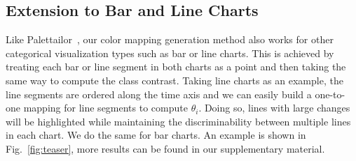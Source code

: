 


\subsection{Extension to Bar and Line Charts}
\label{subsec:ext}
Like Palettailor~\cite{Lu21}, our color mapping generation method also works for other categorical visualization types such as bar or line charts. This is achieved by treating each bar or line segment in both charts as a point and then taking the same way to compute the class contrast.
Taking line charts as an example,  the line segments are ordered along the time axis and we can easily build a one-to-one mapping for line segments to compute $\theta_i$.
Doing so, lines with large changes will be highlighted while maintaining the discriminability between multiple lines in each chart. We do the same for bar charts.
An example is shown in Fig.~\ref{fig:teaser},
more results can be found in our supplementary material.

